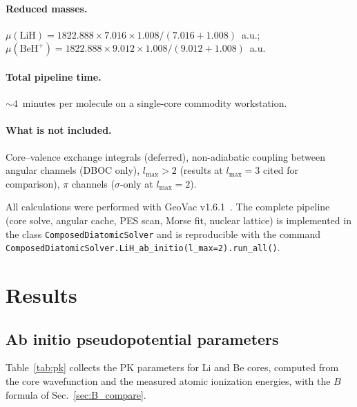 \documentclass[aps,pra,twocolumn,superscriptaddress,longbibliography,floatfix]{revtex4-2}
\begin{document}
\paragraph{Reduced masses.}
$\mu(\text{LiH}) = 1822.888 \times 7.016 \times 1.008 / (7.016 + 1.008)$~a.u.;
$\mu(\text{BeH}^+) = 1822.888 \times 9.012 \times 1.008 / (9.012 + 1.008)$~a.u.

\paragraph{Total pipeline time.}
${\sim}4$~minutes per molecule on a single-core commodity workstation.

\paragraph{What is not included.}
Core--valence exchange integrals (deferred),
non-adiabatic coupling between angular channels (DBOC only),
$l_{\max} > 2$ (results at $l_{\max} = 3$ cited for comparison),
$\pi$ channels ($\sigma$-only at $l_{\max} = 2$).

All calculations were performed with GeoVac
v1.6.1~\cite{geovac2026}.  The complete pipeline (core solve, angular
cache, PES scan, Morse fit, nuclear lattice) is implemented in the
class \texttt{ComposedDiatomicSolver} and is reproducible with the
command
\texttt{ComposedDiatomicSolver.LiH\_ab\_initio(l\_max=2).run\_all()}.


\section{Results}
\label{sec:results}

\subsection{Ab initio pseudopotential parameters}
\label{sec:pk_params}

Table~\ref{tab:pk} collects the PK parameters for Li and Be cores,
computed from the core wavefunction and the measured atomic ionization
energies, with the $B$ formula of Sec.~\ref{sec:B_compare}.
\end{document}
